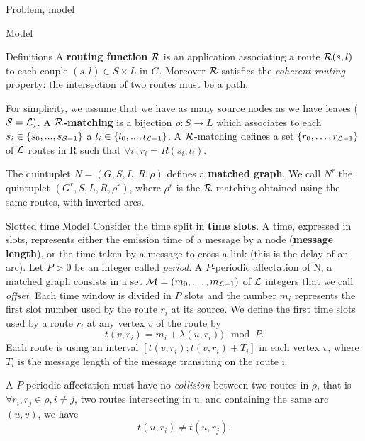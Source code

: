 \documentclass[a4paper,10pt]{report}
\newcommand\rmatching{$\cal R$-matching\xspace}
\newcommand\matchedgraph{{\bf matched graph}}
\begin{document}
\begin{chapter}{Problem, model}
\begin{section}{Model}
\begin{subsection}{Definitions}
A {\bf routing function} ${\cal R}$ is an application associating a route ${\cal R}(s,l)$ to each couple $(s,l) \in S \times L$ in $G$.
Moreover ${\cal R}$ satisfies the \emph{coherent routing} property: the intersection of two routes must be a path.

For simplicity, we assume that we have as many source nodes as we have leaves (${\cal S} = {\cal L})$.
A {\bf ${\cal R}$-matching} is a bijection $\rho :S\rightarrow L$ which associates to each $s_i \in \{s_0,...,s_{{\cal S}-1}\}$ 
a $l_i \in \{l_0,...,l_{{\cal L}-1}\}$.
A \rmatching defines a set $\{r_0, \ldots ,r_{{\cal L}-1}\}$ of ${\cal L}$ routes in R such that $\forall i\,, r_i = R(s_i,l_i)$.

The quintuplet $N=(G,S,L,R,\rho)$ defines a \matchedgraph. We call $N^r$ the quintuplet $(G^r,S,L,R,\rho^r)$, 
where $\rho^r$ is the \rmatching obtained using the same routes, with inverted arcs.

\end{subsection}
\begin{subsection}{Slotted time Model}
Consider the time split in {\bf time slots}. A time, expressed in slots, represents either the emission time of a message by a node ({\bf message length}),
or the time taken by a message to cross a link (this is the delay of an arc).
Let $P>0$ be an integer called {\em period}. 
A $P$-periodic affectation of N, a matched graph consists in a set  ${\cal M}=(m_0, \ldots ,m_{{\cal L}-1})$
of ${\cal L}$ integers that we call \emph{offset}. 
Each time window is divided in $P$ slots and the number $m_i$ represents the first slot number used by the route $r_i$ at its source.
We define the first time slots used by a route $r_i$ at any vertex $v$ of the route by $$t(v,r_i) = m_i+\lambda(u,r_i)) \mod P.$$
Each route is using an interval $[t(v,r_i);t(v,r_i)+T_i]$ in each vertex $v$, where $T_i$ is the message length of the message transiting on the route i.

A $P$-periodic affectation must have no {\em collision} between two routes in $\rho$, that is $\forall r_i, r_j \in \rho, i \ne j$,
two routes intersecting in u, and containing the same arc $(u,v)$, we have $$t(u,r_i)\ne t(u,r_j) .$$

\end{subsection}
\end{section}
\end{chapter}
\end{document}

